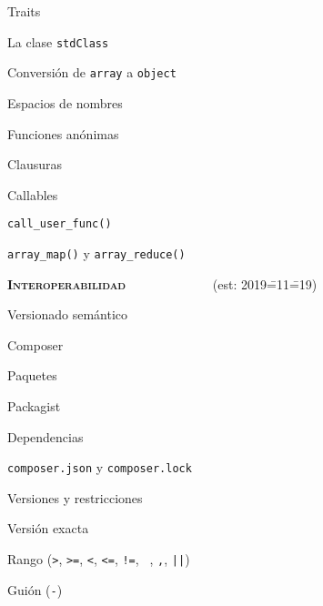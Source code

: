\begin{longenum}
\begin{longenum}
\begin{longenum}
            \item Traits
            \item La clase \texttt{stdClass}
            \begin{longenum}
                \item Conversión de \texttt{array} a \texttt{object}
            \end{longenum}
        \end{longenum}
        \item Espacios de nombres
        \item Funciones anónimas
        \begin{longenum}
            \item Clausuras
        \end{longenum}
        \item Callables
        \begin{longenum}
            \item \texttt{call\_user\_func()}
            \item \texttt{array\_map()} y \texttt{array\_reduce()}
        \end{longenum}
    \end{longenum}
    \item \textbf{\textsc{Interoperabilidad}} \ \ \ \ \ \ \ \ \ \ \ \ \ (est: 2019\==11\==19)
    \begin{longenum}
        \item Versionado semántico
        \item Composer
        \begin{longenum}
            \item Paquetes
            \item Packagist
            \item Dependencias
            \begin{longenum}
                \item \texttt{composer.json} y \texttt{composer.lock}
            \end{longenum}
            \item Versiones y restricciones
            \begin{longenum}
                \item Versión exacta
                \item Rango (\texttt{>}, \texttt{>=}, \texttt{<}, \texttt{<=}, \texttt{!=}, \texttt{ }, \texttt{,}, \texttt{||})
                \item Guión (\texttt{-})

\end{longenum}
\end{longenum}
\end{longenum}
\end{longenum}
